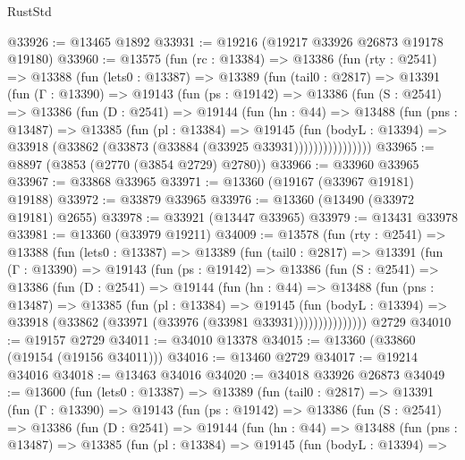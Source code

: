 \begin{lexlean}{RustStd}
\begin{coremodule}
@33926 := @13465 @1892
@33931 := @19216 (@19217 @33926 @26873 @19178 @19180)
@33960 := @13575
    (fun (rc : @13384) =>
    @13386
      (fun (rty : @2541) =>
      @13388
        (fun (lets0 : @13387) =>
        @13389
          (fun (tail0 : @2817) =>
          @13391
            (fun (Γ : @13390) =>
            @19143
              (fun (ps : @19142) =>
              @13386
                (fun (S : @2541) =>
                @13386
                  (fun (D : @2541) =>
                  @19144
                    (fun (hn : @44) =>
                    @13488
                      (fun (pns : @13487) =>
                      @13385
                        (fun (pl : @13384) =>
                        @19145
                          (fun (bodyL : @13394) =>
                          @33918 (@33862 (@33873 (@33884 (@33925 @33931))))))))))))))))
@33965 := @8897 (@3853 (@2770 (@3854 @2729) @2780))
@33966 := @33960 @33965
@33967 := @33868 @33965
@33971 := @13360 (@19167 (@33967 @19181) @19188)
@33972 := @33879 @33965
@33976 := @13360 (@13490 (@33972 @19181) @2655)
@33978 := @33921 (@13447 @33965)
@33979 := @13431 @33978
@33981 := @13360 (@33979 @19211)
@34009 := @13578
    (fun (rty : @2541) =>
    @13388
      (fun (lets0 : @13387) =>
      @13389
        (fun (tail0 : @2817) =>
        @13391
          (fun (Γ : @13390) =>
          @19143
            (fun (ps : @19142) =>
            @13386
              (fun (S : @2541) =>
              @13386
                (fun (D : @2541) =>
                @19144
                  (fun (hn : @44) =>
                  @13488
                    (fun (pns : @13487) =>
                    @13385
                      (fun (pl : @13384) =>
                      @19145
                        (fun (bodyL : @13394) =>
                        @33918 (@33862 (@33971 (@33976 (@33981 @33931)))))))))))))))
    @2729
@34010 := @19157 @2729
@34011 := @34010 @13378
@34015 := @13360 (@33860 (@19154 (@19156 @34011)))
@34016 := @13460 @2729
@34017 := @19214 @34016
@34018 := @13463 @34016
@34020 := @34018 @33926 @26873
@34049 := @13600
    (fun (lets0 : @13387) =>
    @13389
      (fun (tail0 : @2817) =>
      @13391
        (fun (Γ : @13390) =>
        @19143
          (fun (ps : @19142) =>
          @13386
            (fun (S : @2541) =>
            @13386
              (fun (D : @2541) =>
              @19144
                (fun (hn : @44) =>
                @13488
                  (fun (pns : @13487) =>
                  @13385
                    (fun (pl : @13384) =>
                    @19145
                      (fun (bodyL : @13394) =>

\end{coremodule}
\end{lexlean}
